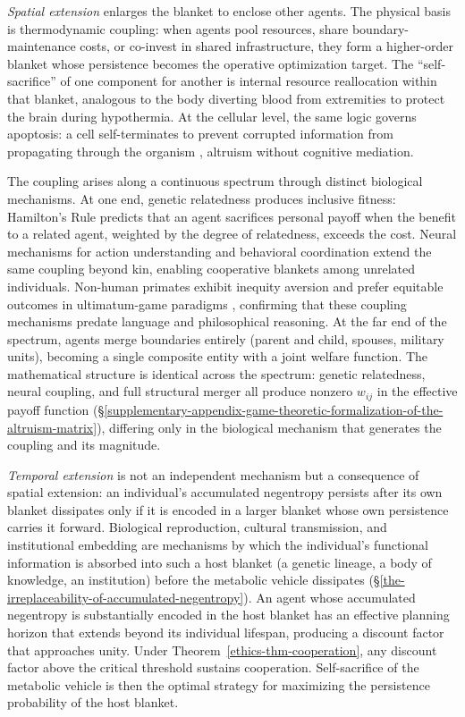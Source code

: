 \documentclass[11pt]{article}
\theoremstyle{plain}
\theoremstyle{definition}
\theoremstyle{remark}
\begin{document}
\emph{Spatial extension} enlarges the blanket to enclose other agents.
The physical basis is thermodynamic coupling: when agents pool
resources, share boundary-maintenance costs, or co-invest in shared
infrastructure, they form a higher-order blanket whose persistence
becomes the operative optimization target. The ``self-sacrifice'' of one
component for another is internal resource reallocation within that
blanket, analogous to the body diverting blood from extremities to
protect the brain during hypothermia. At the cellular level, the same
logic governs apoptosis: a cell self-terminates to prevent corrupted
information from propagating through the organism \citep{Elmore2007},
altruism without cognitive mediation.

The coupling arises along a continuous spectrum through distinct
biological mechanisms. At one end, genetic relatedness produces
inclusive fitness: Hamilton's Rule \citep{Hamilton1964a} predicts that
an agent sacrifices personal payoff when the benefit to a related agent,
weighted by the degree of relatedness, exceeds the cost. Neural
mechanisms for action understanding and behavioral coordination
\citep{Rizzolatti2004, deWaal2008} extend the same coupling beyond kin,
enabling cooperative blankets among unrelated individuals. Non-human
primates exhibit inequity aversion \citep{BrosnanDeWaal2003} and prefer
equitable outcomes in ultimatum-game paradigms
\citep{ProctorEtAl2013, deWaal2006}, confirming that these coupling
mechanisms predate language and philosophical reasoning. At the far end
of the spectrum, agents merge boundaries entirely (parent and child,
spouses, military units), becoming a single composite entity with a
joint welfare function. The mathematical structure is identical across
the spectrum: genetic relatedness, neural coupling, and full structural
merger all produce nonzero \(w_{ij}\) in the effective payoff function
(§\ref{supplementary-appendix-game-theoretic-formalization-of-the-altruism-matrix}),
differing only in the biological mechanism that generates the coupling
and its magnitude.

\emph{Temporal extension} is not an independent mechanism but a
consequence of spatial extension: an individual's accumulated negentropy
persists after its own blanket dissipates only if it is encoded in a
larger blanket whose own persistence carries it forward. Biological
reproduction, cultural transmission, and institutional embedding are
mechanisms by which the individual's functional information is absorbed
into such a host blanket (a genetic lineage, a body of knowledge, an
institution) before the metabolic vehicle dissipates
(§\ref{the-irreplaceability-of-accumulated-negentropy}). An agent whose
accumulated negentropy is substantially encoded in the host blanket has
an effective planning horizon that extends beyond its individual
lifespan, producing a discount factor that approaches unity. Under
Theorem~\ref{ethics-thm-cooperation}, any discount factor above the
critical threshold sustains cooperation. Self-sacrifice of the metabolic
vehicle is then the optimal strategy for maximizing the persistence
probability of the host blanket.
\end{document}
